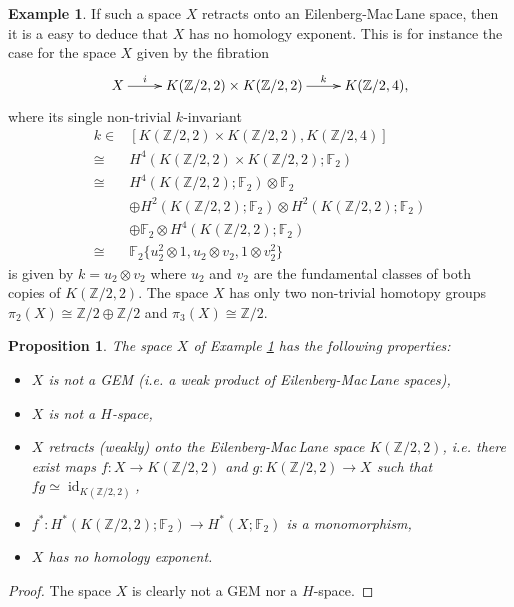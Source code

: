 \documentclass{conm-p-l}
\newtheorem{prop}[thm]{Proposition}
\theoremstyle{definition}
\newtheorem{exmp}[thm]{Example}
\DeclareMathOperator{\id}{id}
\newcommand{\Z}{\mathbb{Z}}
\newcommand{\F}{\mathbb{F}}
\begin{document}
\medskip
\begin{exmp}\label{e:retract}
If such a space $X$ retracts onto an Eilenberg-Mac\,Lane space, then it is a easy to deduce that $X$ has no homology exponent. This is for instance the case for the space $X$ given by the fibration
$$\xymatrix{
X\ar[r]^-i &K(\Z/2,2)\times K(\Z/2,2)\ar[r]^-k &K(\Z/2,4),
}$$
where its single non-trivial $k$-invariant
\begin{align*}
k \in& [K(\Z/2,2)\times K(\Z/2,2),K(\Z/2,4)]\\
\cong &H^4(K(\Z/2,2)\times K(\Z/2,2);\F_2)\\
\cong &H^4(K(\Z/2,2);\F_2)\otimes\F_2\\
&\oplus H^2(K(\Z/2,2);\F_2)\otimes H^2(K(\Z/2,2);\F_2)\\
&\oplus\F_2\otimes H^4(K(\Z/2,2);\F_2)\\
\cong &\F_2\{u_2^2\otimes1,u_2\otimes v_2,1\otimes v_2^2\}
\end{align*}
is given by $k=u_2\otimes v_2$ where $u_2$ and $v_2$ are the fundamental classes of both copies of $K(\Z/2,2)$. The space $X$ has only two non-trivial homotopy groups $\pi_2(X)\cong\Z/2\oplus\Z/2$ and $\pi_3(X)\cong\Z/2$.

\begin{prop}\label{p:retract}
The space $X$ of Example \ref{e:retract} has the following properties:
\begin{itemize}
\item[1.]{$X$ is not a GEM (i.e. a weak product of Eilenberg-Mac\,Lane spaces),}
\item[2.]{$X$ is not a ${H}$-space,}
\item[3.]{$X$ retracts (weakly) onto the Eilenberg-Mac\,Lane space $K(\Z/2,2)$, i.e. there exist maps $f:X\to K(\Z/2,2)$ and $g:K(\Z/2,2)\to X$ such that $fg\simeq\id_{K(\Z/2,2)}$,}
\item[4.]{$f^*:H^*(K(\Z/2,2);\F_2)\to H^*(X;\F_2)$ is a monomorphism,}
\item[5.]{$X$ has no homology exponent.}
\end{itemize}
\end{prop}

\begin{proof}
The space $X$ is clearly not a GEM nor a ${H}$-space. 


\end{proof}
\end{exmp}
\end{document}
